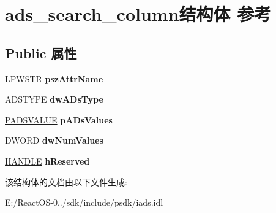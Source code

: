 \hypertarget{structads__search__column}{}\section{ads\+\_\+search\+\_\+column结构体 参考}
\label{structads__search__column}
\subsection*{Public 属性}
\begin{DoxyCompactItemize}
\item 
\mbox{\label{structads__search__column_aa8afa53487123c166d8120ced6e1d7db}} 
L\+P\+W\+S\+TR {\bfseries psz\+Attr\+Name}
\item 
\mbox{\label{structads__search__column_ad652e74c077a11fc3b9864a6cce24732}} 
A\+D\+S\+T\+Y\+PE {\bfseries dw\+A\+Ds\+Type}
\item 
\mbox{\label{structads__search__column_a9a99182911b9b6dbb00898d351820141}} 
\hyperlink{struct__adsvalue}{P\+A\+D\+S\+V\+A\+L\+UE} {\bfseries p\+A\+Ds\+Values}
\item 
\mbox{\label{structads__search__column_ae79fa960d91d656b479be90c8f7c5f8a}} 
D\+W\+O\+RD {\bfseries dw\+Num\+Values}
\item 
\mbox{\label{structads__search__column_a321c8d941e5357ea4ca6465927d2ad91}} 
\hyperlink{interfacevoid}{H\+A\+N\+D\+LE} {\bfseries h\+Reserved}
\end{DoxyCompactItemize}


该结构体的文档由以下文件生成\+:\begin{DoxyCompactItemize}
\item 
E\+:/\+React\+O\+S-\/0../sdk/include/psdk/iads.\+idl\end{DoxyCompactItemize}
